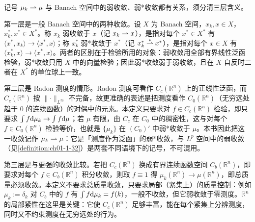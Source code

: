 \documentclass[../../main.tex]{subfiles}%
\begin{document}
\begin{remark}\label{remark:ch01-def-1-31-动机}
记号 $\mu_k\rightharpoonup\mu$ 与 Banach 空间中的弱收敛、弱*收敛都有关系，须分清三层含义。

第一层是一般 Banach 空间中的两种收敛。设 $X$ 为 Banach 空间，$x_k,x\in X$，$x_k^* ,x^*\in X^*$。称 $x_k$ 弱收敛于 $x$（记 $x_k\rightharpoonup x$），是指对每个 $x^*\in X^*$ 有 $\langle x^*,x_k\rangle\to\langle x^*,x\rangle$；称 $x_k^*$ 弱*收敛于 $x^*$（记 $x_k^*\overset{\ast}{\rightharpoonup} x^*$），是指对每个 $x\in X$ 有 $\langle x_k^*,x\rangle\to\langle x^*,x\rangle$。两者的区别在于检验所用的对象：弱收敛用全部有界线性泛函检验，弱*收敛只用 $X$ 中的向量检验；因此弱*收敛弱于弱收敛，且在 $X$ 自反时二者在 $X^*$ 的单位球上一致。

第二层是 Radon 测度的情形。Radon 测度可看作 $C_c(\mathbb{R}^n)$ 上的正线性泛函，而 $C_c(\mathbb{R}^n)$ 按 $\lVert\cdot\rVert_{L^\infty}$ 不完备，故更准确的表述是把测度看作 $C_0(\mathbb{R}^n)$（无穷远处趋于 $0$ 的连续函数）的对偶中的元素。本定义只要求对 $f\in C_c(\mathbb{R}^n)$ 检验，即只要求 $\int f\mathrm{d}\mu_k\to\int f\mathrm{d}\mu$；若 $\mu$ 有限，由 $C_c$ 在 $C_0$ 中的稠密性，这与对每个 $f\in C_0(\mathbb{R}^n)$ 检验等价，也就是 $\{\mu_k\}$ 在 $(C_0)'$ 中弱*收敛于 $\mu$。本书因此把这一收敛记作 $\mu_k\rightharpoonup\mu$：它是「测度作为泛函」的弱*收敛，与 $L^p$ 空间中的弱收敛（见\cref{definition:ch01-1-32}）是两套不同语境下的记号，不可混用。%

第三层是与更强的收敛比较。若把 $C_c(\mathbb{R}^n)$ 换成有界连续函数空间 $C_b(\mathbb{R}^n)$，即要求对每个 $f\in C_b(\mathbb{R}^n)$ 积分收敛，则取 $f\equiv1$ 得 $\mu_k(\mathbb{R}^n)\to\mu(\mathbb{R}^n)$，即总质量必须收敛。本定义不要求总质量收敛，只要求局部（紧集上）的质量控制：例如 $\mu_k:=\delta_k$ 对 $C_b$ 中的 $f$ 有 $\int f\mathrm{d}\mu_k=f(k)$，一般不收敛，但它弱收敛于零测度。$\mathbb{R}^n$ 的局部紧性在这里是关键：它使 $C_c(\mathbb{R}^n)$ 足够丰富，能在每个紧集上分辨测度，同时又不约束测度在无穷远处的行为。
\end{remark}
\end{document}
